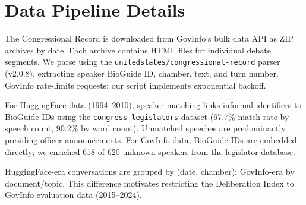 \documentclass[12pt]{article}
\begin{document}
\section{Data Pipeline Details}
\label{app:data}

The Congressional Record is downloaded from GovInfo's bulk data API as ZIP archives by date. Each archive contains HTML files for individual debate segments. We parse using the \texttt{unitedstates/congressional-record} parser (v2.0.8), extracting speaker BioGuide ID, chamber, text, and turn number. GovInfo rate-limits requests; our script implements exponential backoff.

For HuggingFace data (1994--2010), speaker matching links informal identifiers to BioGuide IDs using the \texttt{congress-legislators} dataset (67.7\% match rate by speech count, 90.2\% by word count). Unmatched speeches are predominantly presiding officer announcements. For GovInfo data, BioGuide IDs are embedded directly; we enriched 618 of 620 unknown speakers from the legislator database.

HuggingFace-era conversations are grouped by (date, chamber); GovInfo-era by document/topic. This difference motivates restricting the Deliberation Index to GovInfo evaluation data (2015--2024).
\end{document}
